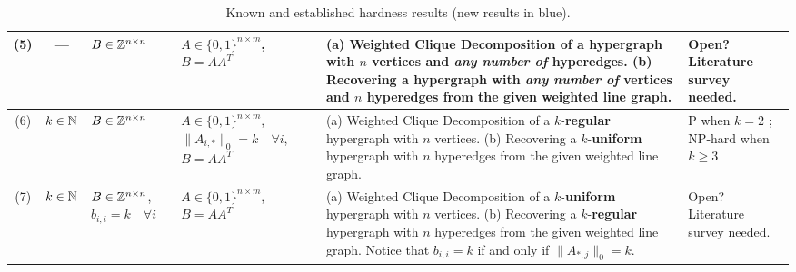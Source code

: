 \begin{table*}[ht]
\begin{tabular}{|c|c|p{}|p{}|p{}|p{}|}
    \hline
    (5) & --- & $B \in \mathbb{Z}^{n \times n}$
    & $A \in \{0,1\}^{n \times m}$,\newline $B=AA^T$
    & (a) Weighted Clique Decomposition of a hypergraph with $n$ vertices and \textit{any number of} hyperedges.
    (b) Recovering a hypergraph with \textit{any number of} vertices and $n$ hyperedges from the given weighted line graph.
    & Open? Literature survey needed.\\
    \hline
    (6) & $k \in \mathbb{N}$ & $B \in \mathbb{Z}^{n \times n}$
    & $A \in \{0,1\}^{n \times m}$,\newline 
    $\|A_{i,*}\|_0=k\quad\forall i$,\newline
    $B=AA^T$
    & (a) Weighted Clique Decomposition of a $k$-\textbf{regular} hypergraph with $n$ vertices.
    (b) Recovering a $k$-\textbf{uniform} hypergraph with $n$ hyperedges from the given weighted line graph.
    & P when $k=2$ \cite{roussopoulos_max_1973,lehot_optimal_1974,syslo_labeling_1982,degiorgi_dynamic_1995,liu_iligra_2015};\newline
    NP-hard when $k \geq 3$ \cite{poljak_complexity_1981,chen_symmetric_2022}\\
    \hline
    (7) & $k \in \mathbb{N}$ & $B \in \mathbb{Z}^{n \times n}$,\newline $b_{i,i}=k \quad\forall i$
    & $A \in \{0,1\}^{n \times m}$,\newline 
    $B=AA^T$
    & (a) Weighted Clique Decomposition of a $k$-\textbf{uniform} hypergraph with $n$ vertices.
    (b) Recovering a $k$-\textbf{regular} hypergraph with $n$ hyperedges from the given weighted line graph.\newline
    Notice that $b_{i,i}=k$ if and only if $\|A_{*,j}\|_0=k$.
    & Open? Literature survey needed.\\
    \hline
  \end{tabular}

  \caption{%
  Known and established hardness results (new results in blue).
  }
  \label{tab:hardness}
\end{table*}
